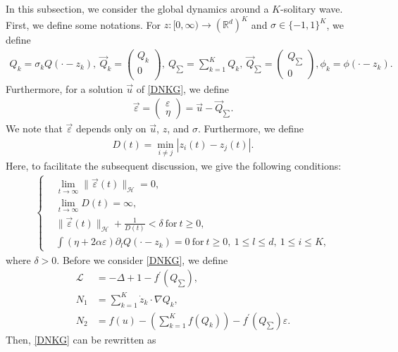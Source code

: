 \documentclass[reqno]{amsart}
\theoremstyle{plain}
\theoremstyle{definition}
\numberwithin{equation}{section}
\renewcommand{\r}{\right}
\newcommand{\1}{\mathbbm{1}}
\begin{document}
In this subsection, we consider the global dynamics around a $K$-solitary wave. First, we define some notations. For $z:[0,\infty)\to (\mathbb{R}^d)^K$ and $\sigma\in \{-1,1\}^K$, we define
\begin{align*}
Q_k=\sigma_k Q(\cdot-z_k),\ \vec{Q}_k=
\begin{pmatrix}
Q_k\\
0   \\
\end{pmatrix}
,\ Q_{\sum}=\sum_{k=1}^KQ_k,\ \vec{Q}_{\sum}=
\begin{pmatrix}
Q_{\sum}
\\
0
\end{pmatrix}
, \phi_k=\phi(\cdot-z_k).
\end{align*}
Furthermore, for a solution $\vec{u}$ of \eqref{DNKG}, we define 
\begin{align*}
\vec{\varepsilon}=
\begin{pmatrix}
\varepsilon
\\
\eta
\end{pmatrix}
=\vec{u}-\vec{Q}_{\sum}.
\end{align*}
We note that $\vec{\varepsilon}$ depends only on $\vec{u}$, $z$, and $\sigma$. Furthermore, we define
\begin{align*}
D(t)=\min_{i\neq j}|z_i(t)-z_j(t)|.
\end{align*}
Here, to facilitate the subsequent discussion, we give the following conditions:
\begin{align}\label{sa}
\left\{
\begin{aligned}
&\lim_{t\to \infty}\|\vec{\varepsilon}(t)\|_{\mathcal{H}}=0,
\\
&\lim_{t\to \infty}D(t)=\infty,
\\
&\|\vec{\varepsilon}(t)\|_{\mathcal{H}}+\frac{1}{D(t)}<\delta\ \mbox{for}\ t\geq 0,
\\
&\int (\eta+2\alpha \varepsilon){\partial}_lQ(\cdot-z_k)=0\  \mbox{for}\ t\geq 0,\ 1\leq l\leq d,\ 1\leq i\leq K,
\end{aligned}
\r.
\end{align}
where $\delta>0$. Before we consider \eqref{DNKG}, we define
\begin{align*}
\mathcal{L}&=-\Delta+1-f^{\prime}(Q_{\sum}),
\\
N_1&=\sum_{k=1}^K \dot{z}_k\cdot \nabla Q_k,
\\
N_2&=f(u)-\left(\sum_{k=1}^Kf(Q_k)\right)-f^{\prime}(Q_{\sum})\varepsilon.
\end{align*}
Then, \eqref{DNKG} can be rewritten as
\end{document}
